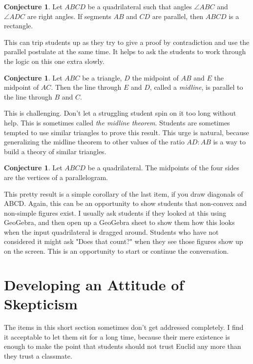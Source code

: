 \documentclass{tufte-handout}
\theoremstyle{definition}
\newtheorem{conjecture}[problem]{Conjecture}
\begin{document}
\begin{conjecture}
\label{conj:opp-parallel-implies-rectangle}
Let $ABCD$ be a quadrilateral such that angles $\angle ABC$ and $\angle ADC$ are right angles.
If segments $AB$ and $CD$ are parallel, then $ABCD$ is a rectangle.
\end{conjecture}

This can trip students up as they try to give a proof by contradiction and use the parallel postulate at the same time. It helps to ask the students to work through the logic on this one extra slowly.

\begin{conjecture}
\label{conj:midline-theorem}
Let $ABC$ be a triangle, $D$ the midpoint of $AB$ and $E$ the midpoint of $AC$.
Then the line through $E$ and $D$, called a \emph{midline}, is parallel to the line through $B$ and $C$.
\end{conjecture}

This is challenging. Don't let a struggling student spin on it too long without help. This is sometimes called \emph{the midline theorem}. Students are sometimes tempted to use similar triangles to prove this result. This urge is natural, because generalizing the midline theorem to other values of the ratio $AD:AB$ is a way to build a theory of similar triangles.



\begin{conjecture}
\label{conj:Varignon}
Let $ABCD$ be a quadrilateral. The midpoints of the four sides are the vertices of a parallelogram.
\end{conjecture}

This pretty result is a simple corollary of the last item, if you draw diagonals of ABCD. Again, this can be an opportunity to show students that non-convex and non-simple figures exist. I usually ask students if they looked at this using GeoGebra, and then open up a GeoGebra sheet to show them how this looks when the input quadrilateral is dragged around. Students who have not considered it might ask "Does that count?" when they see those figures show up on the screen. This is an opportunity to start or continue the conversation.


\clearpage
\setcounter{section}{4}
\setcounter{problem}{0}
\section{Developing an Attitude of Skepticism}

The items in this short section sometimes don't get addressed completely. I find it acceptable to let them sit for a long time, because their mere existence is enough to make the point 
that students should not trust Euclid any more than they trust a classmate.
\end{document}
